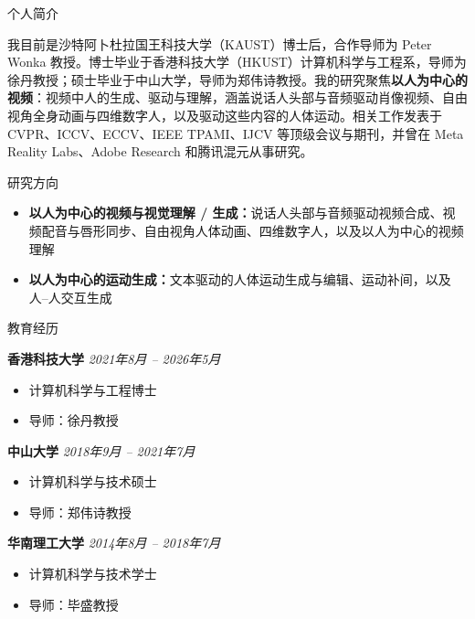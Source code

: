 \documentclass{resume}
\begin{document}
\begin{rSection}{个人简介}

\begin{itemize}[leftmargin=10pt]
\setlength{\itemsep}{-5pt}
我目前是沙特阿卜杜拉国王科技大学（KAUST）博士后，合作导师为 Peter Wonka 教授。博士毕业于香港科技大学（HKUST）计算机科学与工程系，导师为徐丹教授；硕士毕业于中山大学，导师为郑伟诗教授。我的研究聚焦\textbf{以人为中心的视频}：视频中人的生成、驱动与理解，涵盖说话人头部与音频驱动肖像视频、自由视角全身动画与四维数字人，以及驱动这些内容的人体运动。相关工作发表于 CVPR、ICCV、ECCV、IEEE TPAMI、IJCV 等顶级会议与期刊，并曾在 Meta Reality Labs、Adobe Research 和腾讯混元从事研究。
\end{itemize}

\end{rSection}

\begin{rSection}{研究方向}

\begin{itemize}[leftmargin=18pt]
    \setlength{\itemsep}{-3pt}
    \item {\color{topicVG}\bfseries 以人为中心的视频与视觉理解 / 生成：}说话人头部与音频驱动视频合成、视频配音与唇形同步、自由视角人体动画、四维数字人，以及以人为中心的视频理解
    \item {\color{topicMO}\bfseries 以人为中心的运动生成：}文本驱动的人体运动生成与编辑、运动补间，以及人--人交互生成
\end{itemize}

\end{rSection}

\begin{rSection}{教育经历}

{\bf 香港科技大学} \hfill {\em 2021年8月 -- 2026年5月}
\vspace{-3pt}
\begin{itemize}[leftmargin=18pt]
    \setlength{\itemsep}{-5pt}
    \item 计算机科学与工程博士
    \item 导师：徐丹教授
\end{itemize}

{\bf 中山大学} \hfill {\em 2018年9月 -- 2021年7月}
\vspace{-3pt}
\begin{itemize}[leftmargin=18pt]
    \setlength{\itemsep}{-5pt}
    \item 计算机科学与技术硕士
    \item 导师：郑伟诗教授
\end{itemize}

{\bf 华南理工大学} \hfill {\em 2014年8月 -- 2018年7月}
\vspace{-3pt}
\begin{itemize}[leftmargin=18pt]
    \setlength{\itemsep}{-5pt}
    \item 计算机科学与技术学士
    \item 导师：毕盛教授
\end{itemize}

\end{rSection}
\end{document}
